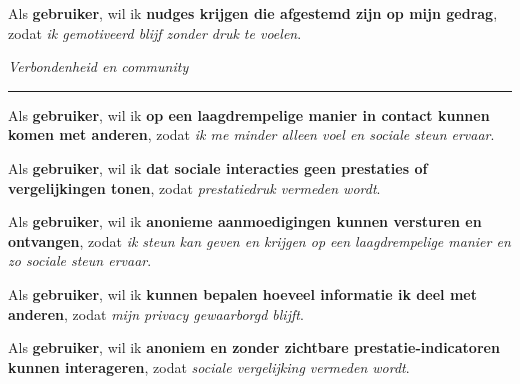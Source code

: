 \vspace{1em}

Als \textbf{gebruiker}, \newline
wil ik \textbf{nudges krijgen die afgestemd zijn op mijn gedrag}, \newline
zodat \textit{ik gemotiveerd blijf zonder druk te voelen}.

\vspace{1em}
\vspace{1em}

\textit{Verbondenheid en community}
\hrule
\vspace{1em}

Als \textbf{gebruiker}, \newline
wil ik \textbf{op een laagdrempelige manier in contact kunnen komen met anderen}, \newline
zodat \textit{ik me minder alleen voel en sociale steun ervaar}.

\vspace{1em}

Als \textbf{gebruiker}, \newline
wil ik \textbf{dat sociale interacties geen prestaties of vergelijkingen tonen}, \newline
zodat \textit{prestatiedruk vermeden wordt}.

\vspace{1em}

Als \textbf{gebruiker}, \newline
wil ik \textbf{anonieme aanmoedigingen kunnen versturen en ontvangen}, \newline
zodat \textit{ik steun kan geven en krijgen op een laagdrempelige manier en zo sociale steun ervaar}.

\vspace{1em}

Als \textbf{gebruiker}, \newline
wil ik \textbf{kunnen bepalen hoeveel informatie ik deel met anderen}, \newline
zodat \textit{mijn privacy gewaarborgd blijft}.

\vspace{1em}

Als \textbf{gebruiker}, \newline
wil ik \textbf{anoniem en zonder zichtbare prestatie-indicatoren kunnen interageren}, \newline
zodat \textit{sociale vergelijking vermeden wordt}.

\vspace{1em}
\vspace{1em}

